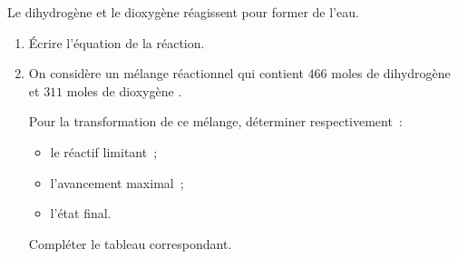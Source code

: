 Le dihydrogène  et le dioxygène  réagissent pour
former de l'eau.
\begin{enumerate}
    \item Écrire l'équation de la réaction.
    \item On considère un mélange réactionnel qui contient $466$ moles de
          dihydrogène  et $311$ moles de dioxygène .

          Pour la transformation de ce mélange, déterminer respectivement~:
          \begin{itemize}
            \item le réactif limitant~;
            \item l'avancement maximal~;
            \item l'état final.
          \end{itemize}

          Compléter le tableau correspondant.
\end{enumerate}
